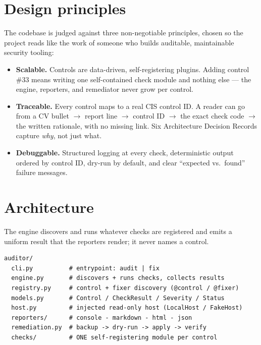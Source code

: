 \documentclass[11pt,a4paper]{article}
\begin{document}
\section{Design principles}
The codebase is judged against three non-negotiable principles, chosen so the project reads like
the work of someone who builds auditable, maintainable security tooling:

\begin{itemize}
  \item \textbf{Scalable.} Controls are data-driven, self-registering plugins. Adding control
        \#33 means writing one self-contained check module and nothing else --- the engine,
        reporters, and remediator never grow per control.
  \item \textbf{Traceable.} Every control maps to a real CIS control ID. A reader can go from a
        CV bullet $\rightarrow$ report line $\rightarrow$ control ID $\rightarrow$ the exact
        check code $\rightarrow$ the written rationale, with no missing link. Six Architecture
        Decision Records capture \emph{why}, not just what.
  \item \textbf{Debuggable.} Structured logging at every check, deterministic output ordered by
        control ID, dry-run by default, and clear ``expected vs.\ found'' failure messages.
\end{itemize}

\section{Architecture}
The engine discovers and runs whatever checks are registered and emits a uniform result that the
reporters render; it never names a control.

\begin{lstlisting}[style=console]
auditor/
  cli.py          # entrypoint: audit | fix
  engine.py       # discovers + runs checks, collects results
  registry.py     # control + fixer discovery (@control / @fixer)
  models.py       # Control / CheckResult / Severity / Status
  host.py         # injected read-only host (LocalHost / FakeHost)
  reporters/      # console - markdown - html - json
  remediation.py  # backup -> dry-run -> apply -> verify
  checks/         # ONE self-registering module per control
\end{lstlisting}
\end{document}
